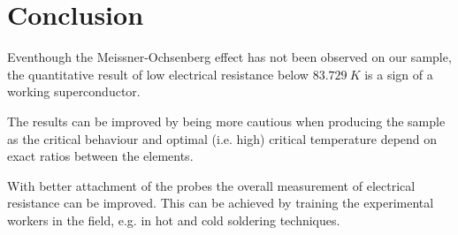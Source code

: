 \section{Conclusion}
\label{sec:conclusion}
Eventhough the Meissner-Ochsenberg effect has not been observed on our sample, the quantitative
result of low electrical resistance below $\SI{83.729}{K}$ is a sign of a working superconductor.

The results can be improved by being more cautious when producing the sample as the critical
behaviour and optimal (i.e. high) critical temperature depend on exact ratios between the elements.

With better attachment of the probes the overall measurement of electrical resistance can be
improved. This can be achieved by training the experimental workers in the field, e.g. in hot and
cold soldering techniques.

